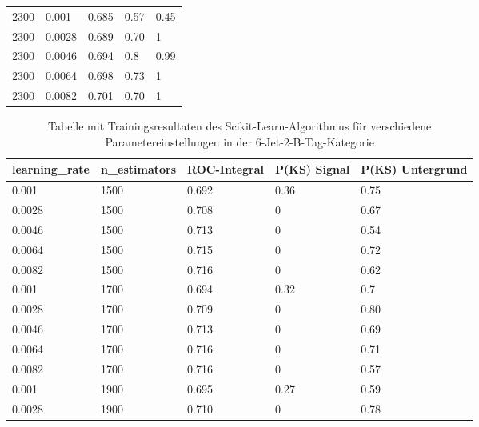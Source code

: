 \begin{table}[tbp]
\begin{center}
\begin{tabular}{lllll}
\num{2300} & \num{0.001}  & \num{0,685} & \num{0,57} & \num{0,45}\\
\num{2300} & \num{0.0028} & \num{0,689} & \num{0,70} & \num{1}\\
\num{2300} & \num{0.0046} & \num{0,694} & \num{0,8}  & \num{0,99}\\
\num{2300} & \num{0.0064} & \num{0,698} & \num{0,73} & \num{1}\\
\num{2300} & \num{0.0082} & \num{0,701} & \num{0,70} & \num{1}\\
  \hline
  \end{tabular}
  \end{center}
\end{table}

\begin{table}[tbp]\parbox{12cm}{
\renewcommand\thetable{A.4}
  \caption[Scikit-Learn 6j2t Ergebnisse]{Tabelle mit Trainingsresultaten des Scikit-Learn-Algorithmus f\"ur verschiedene Parametereinstellungen in der 6-Jet-2-B-Tag-Kategorie}%
  }\label{tab:sklearn_6j2t}
  \begin{center}
  \begin{tabular}{lllll}
  \hline
  learning\_rate & n\_estimators & ROC-Integral & P(KS) Signal & P(KS) Untergrund\\
  \hline
\num{0,001}  & \num{1500} & \num{0,692} & \num{0,36} & \num{0,75}\\
\num{0,0028} & \num{1500} & \num{0,708} & \num{0}    & \num{0,67}\\
\num{0,0046} & \num{1500} & \num{0,713} & \num{0}    & \num{0,54}\\
\num{0,0064} & \num{1500} & \num{0,715} & \num{0}    & \num{0,72}\\
\num{0,0082} & \num{1500} & \num{0,716} & \num{0}    & \num{0,62}\\
\num{0,001}  & \num{1700} & \num{0,694} & \num{0,32} & \num{0,7}\\
\num{0,0028} & \num{1700} & \num{0,709} & \num{0}    & \num{0,80}\\
\num{0,0046} & \num{1700} & \num{0,713} & \num{0}    & \num{0,69}\\
\num{0,0064} & \num{1700} & \num{0,716} & \num{0}    & \num{0,71}\\
\num{0,0082} & \num{1700} & \num{0,716} & \num{0}    & \num{0,57}\\
\num{0,001}  & \num{1900} & \num{0,695} & \num{0,27} & \num{0,59}\\
\num{0,0028} & \num{1900} & \num{0,710} & \num{0}    & \num{0,78}\\

\end{tabular}
\end{center}
\end{table}
